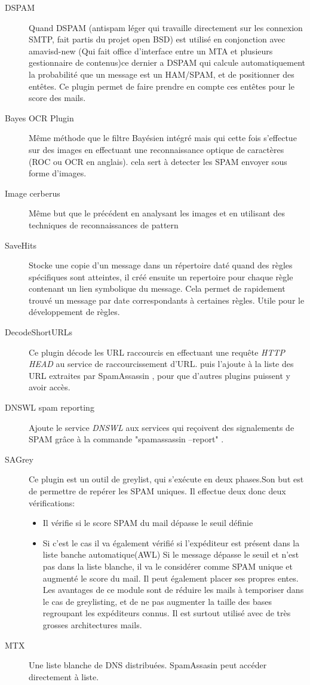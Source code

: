 \documentclass[a4paper,11pt]{article}
\begin{document}
\begin{description}
 \item [DSPAM]Quand DSPAM (antispam léger qui travaille directement sur les connexion SMTP, fait partis du projet open BSD) est utilisé en conjonction avec amavisd-new
 (Qui fait office d'interface entre un MTA et plusieurs gestionnaire de contenus)ce dernier a DSPAM qui calcule automatiquement
 la probabilité que un message est un HAM/SPAM, et de positionner des entêtes. Ce plugin permet de faire prendre en compte 
 ces entêtes pour le score des mails.
 \item [Bayes OCR Plugin] Même méthode que le filtre Bayésien intégré mais qui cette fois s'effectue sur des images en effectuant une reconnaissance 
 optique de caractères (ROC ou OCR en anglais). cela sert à detecter les SPAM envoyer sous forme d'images.
 \item[Image cerberus] Même but que le précédent en analysant les images et en utilisant des techniques de reconnaissances de pattern
 \item[SaveHits]Stocke une copie d'un message dans un répertoire daté quand des règles spécifiques 
 sont atteintes, il créé ensuite un repertoire pour chaque règle contenant un lien symbolique du message.
 Cela permet de rapidement trouvé un message par date correspondants à certaines règles. Utile pour le développement de règles.
 \item [DecodeShortURLs] Ce plugin décode les URL raccourcis en effectuant une requête \emph{HTTP HEAD} au service de raccourcissement d'URL.
 puis l'ajoute à la liste des URL extraites par SpamAssassin , pour que d'autres plugins puissent y avoir accès.
 \item [DNSWL spam reporting] Ajoute le service \emph{DNSWL} aux services qui reçoivent des signalements de SPAM
 grâce à la commande  "spamassassin --report" .
 \item [SAGrey]  Ce plugin est un outil de greylist, qui s’exécute en deux phases.Son but est de permettre 
 de repérer les SPAM uniques. Il effectue deux donc deux vérifications:
 \begin{itemize}
  \item Il vérifie si le score SPAM du mail dépasse le seuil définie
  \item Si c'est le cas il va également vérifié si l’expéditeur est présent dans la liste banche automatique(AWL)
  Si le message dépasse le seuil et n'est pas dans la liste blanche, il va le considérer comme SPAM unique et augmenté le score du mail.
  Il peut également placer ses propres entes. Les avantages de ce module sont de réduire les mails à temporiser dans le cas de greylisting,
  et de ne pas augmenter la taille des bases regroupant les expéditeurs connus. Il est surtout utilisé 
  avec de très grosses architectures mails.
 \end{itemize}

 \item [MTX] Une liste blanche de DNS distribuées. SpamAssasin peut accéder directement à liste.
 \end{description}
\end{document}
